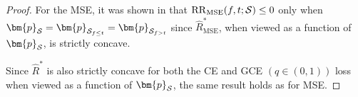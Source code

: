 \documentclass[letterpaper]{article} %
\newcommand{\bp}{{\bm{p}}}
\newcommand{\cP}{{\cal{P}}}
\newcommand{\cS}{{\cal{S}}}
\newcommand{\RR}{{\rm RR}}
\begin{document}
\begin{proof}
    For the MSE, it was shown in \cite{breiman1984classification} that $\RR_{\mathrm{MSE}}(f,t;\cS)\leq 0$ only when $\bp_{\cS}=\bp_{\cS_{f\leq t}}=\bp_{\cS_{f > t}}$ since $\widehat{R}_{\mathrm{MSE}}^*$,
    when viewed as a function of $\bp_{\cS}$,
    is strictly concave.

    Since $\widehat{R}^*$ is also strictly concave for both the CE and GCE $(q\in(0,1))$ loss when viewed as a function of $\bp_{\cS}$, the same result holds as for MSE.
\end{proof}
\end{document}
